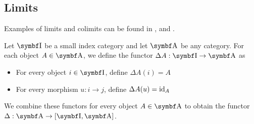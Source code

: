 \subsection{Limits}\label{subsec:categorical_limits}

\begin{remark}\label{def:categorical_limit_examples}
  Examples of limits and colimits can be found in ,  and .
\end{remark}

\begin{definition}\label{def:diagonal_functor}\cite[143]{Leinster2014}
  Let \( \Bold I \) be a small index category and let \( \Bold A \) be any category. For each object \( A \in \Bold A \), we define the functor \( \Delta A: \Bold I \to \Bold A \) as
  \begin{itemize}
    \item For every object \( i \in \Bold I \), define \( \Delta A(i) = A \)
    \item For every morphism \( u: i \to j \), define \( \Delta A(u) = \operatorname{id}_A \)
  \end{itemize}

  We combine these functors for every object \( A \in \Bold A \) to obtain the functor \( \Delta: \Bold A \to [\Bold I, \Bold A] \).
\end{definition}

